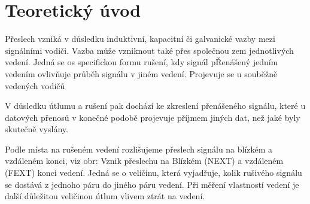 \documentclass[a4paper, czech]{article}
\begin{document}
\section{Teoretický úvod}

Přeslech vzniká v důsledku induktivní, kapacitní či galvanické vazby mezi signálními vodiči.
Vazba může vzniknout také přes společnou zem jednotlivých vedení.
Jedná se os specifickou formu rušení, kdy signál pŘenášený jedním vedením ovlivňuje průběh signálu v jiném vedení.
Projevuje se u souběžně vedených vodičů

V důsledku útlumu a rušení pak dochází ke zkreslení přenášeného signálu, které u datových přenosů v konečné podobě projevuje příjmem jiných dat, než jaké byly skutečně vyslány.

Podle místa na rušeném vedení rozlišujeme přeslech signálu na blízkém a vzdáleném konci, viz obr: Vznik přeslechu na Blízkém (NEXT) a vzdáleném (FEXT) konci vedení. Jedná se o veličinu, která vyjadřuje, kolik rušivého signálu se dostává z jednoho páru do jiného páru vedení. Při měření vlastností vedení je další důležitou veličinou útlum vlivem ztrát na vedení. 
\end{document}
